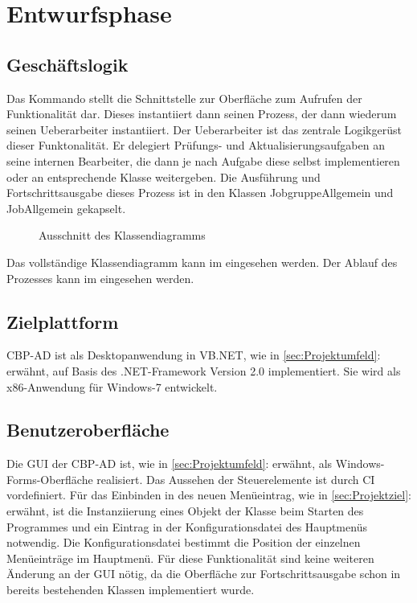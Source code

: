 
\clearpage
\section{Entwurfsphase} 
\label{sec:Entwurfsphase}

\subsection{Geschäftslogik}
\label{sec:Geschaeftslogik}

Das Kommando stellt die Schnittstelle zur Oberfläche zum Aufrufen der Funktionalität dar. Dieses instantiiert dann seinen Prozess, der dann wiederum seinen Ueberarbeiter instantiiert. Der Ueberarbeiter ist das zentrale Logikgerüst dieser Funktonalität. Er delegiert Prüfungs- und Aktualisierungsaufgaben an seine internen Bearbeiter, die dann je nach Aufgabe diese selbst implementieren oder an entsprechende Klasse weitergeben. Die Ausführung und Fortschrittsausgabe dieses Prozess ist in den Klassen JobgruppeAllgemein und JobAllgemein gekapselt.

\begin{figure}[htb]
	\centering
	\caption{Ausschnitt des Klassendiagramms}
\end{figure}

Das vollständige Klassendiagramm kann im  eingesehen werden.
Der Ablauf des Prozesses kann im  eingesehen werden.

\subsection{Zielplattform}
\label{sec:Zielplattform}

\ac{CBP-AD} ist als Desktopanwendung in \acs{VB}.NET, wie in \ref{sec:Projektumfeld}:  erwähnt, auf Basis des .NET-Framework Version 2.0 implementiert.
Sie wird als x86-Anwendung für Windows-7 entwickelt.


\subsection{Benutzeroberfläche}
\label{sec:Benutzeroberflaeche}

Die \acs{GUI} der \ac{CBP-AD} ist, wie in \ref{sec:Projektumfeld}:  erwähnt, als Windows-Forms-Oberfläche realisiert. Das Aussehen der Steuerelemente ist durch \ac{CI} vordefiniert. Für das Einbinden in des neuen Menüeintrag, wie in \ref{sec:Projektziel}:  erwähnt, ist die Instanziierung eines Objekt der Klasse  beim Starten des Programmes und ein Eintrag in der Konfigurationsdatei des Hauptmenüs notwendig. Die Konfigurationsdatei bestimmt die Position der einzelnen Menüeinträge im Hauptmenü. Für diese Funktionalität sind keine weiteren Änderung an der \acs{GUI} nötig, da die Oberfläche zur Fortschrittsausgabe schon in bereits bestehenden Klassen implementiert wurde.

